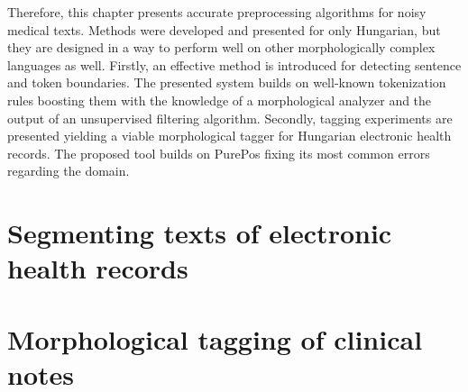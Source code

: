 Therefore, this chapter presents accurate preprocessing algorithms for noisy medical texts.
Methods were developed and presented for only Hungarian, but they are designed in a way to perform well on other morphologically complex languages as well. 
Firstly, an effective method is introduced for detecting sentence and token boundaries.
The presented system builds on well-known tokenization rules boosting them with the knowledge of a morphological analyzer and the output of an unsupervised filtering algorithm.
Secondly, tagging experiments are presented yielding a viable morphological tagger for Hungarian electronic health records. 
The proposed tool builds on PurePos fixing its most common errors regarding the domain.

\section{Segmenting texts of electronic health records}\label{sec:clin_segm}


\pagebreak

\section{Morphological tagging of clinical notes}\label{sec:clin_tag}


